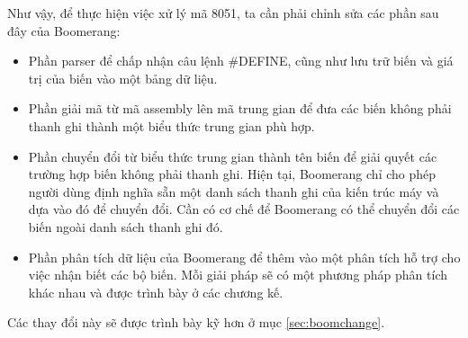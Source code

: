 Như vậy, để thực hiện việc xử lý mã 8051, ta cần phải chỉnh sửa các phần sau đây của Boomerang:
\begin{itemize}
	\item Phần parser để chấp nhận câu lệnh \#DEFINE, cũng như lưu trữ biến và giá trị của biến vào một bảng dữ liệu.
	\item Phần giải mã từ mã assembly lên mã trung gian để đưa các biến không phải thanh ghi thành một biểu thức trung gian phù hợp.
	\item Phần chuyển đổi từ biểu thức trung gian thành tên biến để giải quyết các trường hợp biến không phải thanh ghi. Hiện tại, Boomerang chỉ cho phép người dùng định nghĩa sẵn một danh sách thanh ghi của kiến trúc máy và dựa vào đó để chuyển đổi. Cần có cơ chế để Boomerang có thể chuyển đổi các biến ngoài danh sách thanh ghi đó.
	\item Phần phân tích dữ liệu của Boomerang để thêm vào một phân tích hỗ trợ cho việc nhận biết các bộ biến. Mỗi giải pháp sẽ có một phương pháp phân tích khác nhau và được trình bày ở các chương kế.
\end{itemize}
Các thay đổi này sẽ được trình bày kỹ hơn ở mục \ref{sec:boomchange}.